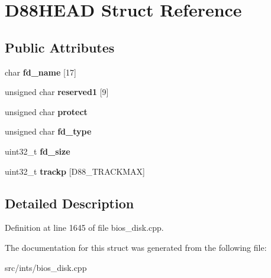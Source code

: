 \hypertarget{structD88HEAD}{\section{D88\-H\-E\-A\-D Struct Reference}
\label{structD88HEAD}
}
\subsection*{Public Attributes}
\begin{DoxyCompactItemize}
\item 
\hypertarget{structD88HEAD_a2c0d333ef195411bba5037f50fd84851}{char {\bfseries fd\-\_\-name} \mbox{[}17\mbox{]}}\label{structD88HEAD_a2c0d333ef195411bba5037f50fd84851}

\item 
\hypertarget{structD88HEAD_a84361ff288bb15c2b0d6f0178ac92307}{unsigned char {\bfseries reserved1} \mbox{[}9\mbox{]}}\label{structD88HEAD_a84361ff288bb15c2b0d6f0178ac92307}

\item 
\hypertarget{structD88HEAD_ae3bd557d9f3ea266a37e5d8e35808169}{unsigned char {\bfseries protect}}\label{structD88HEAD_ae3bd557d9f3ea266a37e5d8e35808169}

\item 
\hypertarget{structD88HEAD_a1d70d36b2a1c7de70b2ea326c60bcbb0}{unsigned char {\bfseries fd\-\_\-type}}\label{structD88HEAD_a1d70d36b2a1c7de70b2ea326c60bcbb0}

\item 
\hypertarget{structD88HEAD_a482cd78a7bd79559ba4982fb5bdadf4e}{uint32\-\_\-t {\bfseries fd\-\_\-size}}\label{structD88HEAD_a482cd78a7bd79559ba4982fb5bdadf4e}

\item 
\hypertarget{structD88HEAD_a7cc91cbeb7f776053cb525dccc7c8abe}{uint32\-\_\-t {\bfseries trackp} \mbox{[}D88\-\_\-\-T\-R\-A\-C\-K\-M\-A\-X\mbox{]}}\label{structD88HEAD_a7cc91cbeb7f776053cb525dccc7c8abe}

\end{DoxyCompactItemize}


\subsection{Detailed Description}


Definition at line 1645 of file bios\-\_\-disk.\-cpp.



The documentation for this struct was generated from the following file\-:\begin{DoxyCompactItemize}
\item 
src/ints/bios\-\_\-disk.\-cpp\end{DoxyCompactItemize}
